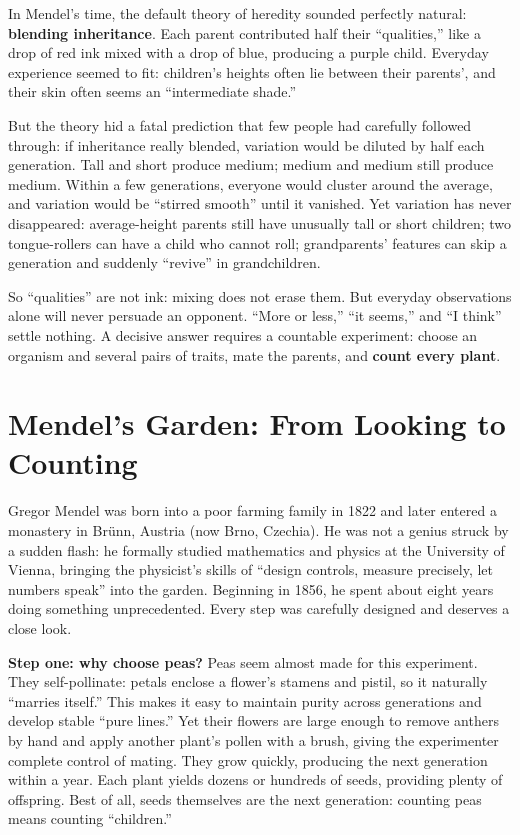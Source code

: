 In Mendel's time, the default theory of heredity sounded perfectly natural: \textbf{blending inheritance}. Each parent contributed half their ``qualities,'' like a drop of red ink mixed with a drop of blue, producing a purple child. Everyday experience seemed to fit: children's heights often lie between their parents', and their skin often seems an ``intermediate shade.''

But the theory hid a fatal prediction that few people had carefully followed through: if inheritance really blended, variation would be diluted by half each generation. Tall and short produce medium; medium and medium still produce medium. Within a few generations, everyone would cluster around the average, and variation would be ``stirred smooth'' until it vanished. Yet variation has never disappeared: average-height parents still have unusually tall or short children; two tongue-rollers can have a child who cannot roll; grandparents' features can skip a generation and suddenly ``revive'' in grandchildren.

So ``qualities'' are not ink: mixing does not erase them. But everyday observations alone will never persuade an opponent. ``More or less,'' ``it seems,'' and ``I think'' settle nothing. A decisive answer requires a countable experiment: choose an organism and several pairs of traits, mate the parents, and \textbf{count every plant}.

\section{Mendel's Garden: From Looking to Counting}

Gregor Mendel was born into a poor farming family in 1822 and later entered a monastery in Brünn, Austria (now Brno, Czechia). He was not a genius struck by a sudden flash: he formally studied mathematics and physics at the University of Vienna, bringing the physicist's skills of ``design controls, measure precisely, let numbers speak'' into the garden. Beginning in 1856, he spent about eight years doing something unprecedented. Every step was carefully designed and deserves a close look.

\textbf{Step one: why choose peas?} Peas seem almost made for this experiment. They self-pollinate: petals enclose a flower's stamens and pistil, so it naturally ``marries itself.'' This makes it easy to maintain purity across generations and develop stable ``pure lines.'' Yet their flowers are large enough to remove anthers by hand and apply another plant's pollen with a brush, giving the experimenter complete control of mating. They grow quickly, producing the next generation within a year. Each plant yields dozens or hundreds of seeds, providing plenty of offspring. Best of all, seeds themselves are the next generation: counting peas means counting ``children.''

